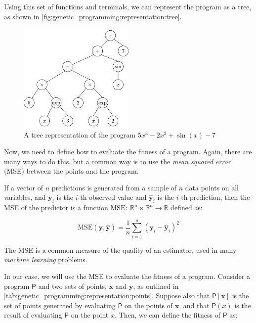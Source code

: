   Using this set of functions and terminals, we can represent the program as a
  tree, as shown in \vref{fig:genetic_programming:representation:tree}.

  \begin{figure}[ht!]
    \centering
    \includegraphics[width=0.5\textwidth]{img/theoretical_framework/Expected Expression Tree.png}
    \caption{
      A tree representation of the program \(5x^3 - 2x^2 + \sin(x) - 7\)
    }
    \label{fig:genetic_programming:representation:tree}
  \end{figure}

  Now, we need to define how to evaluate the fitness of a program.
  Again, there are many ways to do this, but a common way is to use the
  \emph{mean squared error} (MSE) between the points and the program.

  \begin{definition}
  \label{def:mse}
    If a vector of \(n\) predictions is generated from a sample of \(n\) data
    points on all variables, and \(\mathbf{y}_i\) is the \(i\)-th observed value
    and \(\hat{\mathbf{y}}_i\) is the \(i\)-th prediction, then the MSE of the 
    predictor is a function \(\mathrm{MSE}:\: \mathbb{R}^n \times \mathbb{R}^n
    \to \mathbb{R}\) defined as:

    \begin{equation}
      \label{eq:mse}
      \mathrm{MSE}(\mathbf{y}, \hat{\mathbf{y}}) 
        = \frac{1}{n} \sum_{i=1}^{n} (\mathbf{y}_i - \hat{\mathbf{y}}_i)^2
    \end{equation}
  \end{definition}

  The MSE is a common measure of the quality of an estimator, used in many
  \textit{machine learning} problems.

  In our case, we will use the MSE to evaluate the fitness of a program.
  Consider a program \(\mathsf{P}\) and two sets of points, \(\mathbf{x}\) and 
  \(\mathbf{y}\), as outlined in 
  \vref{tab:genetic_programming:representation:points}.
  Suppose also that \(\mathsf{P}[\mathbf{x}]\) is the set of points generated
  by evaluating \(\mathsf{P}\) on the points of \(\mathbf{x}\), and that
  \(\mathsf{P}(x)\) is the result of evaluating \(\mathsf{P}\) on the point
  \(x\).
  Then, we can define the fitness of \(\mathsf{P}\) as:

